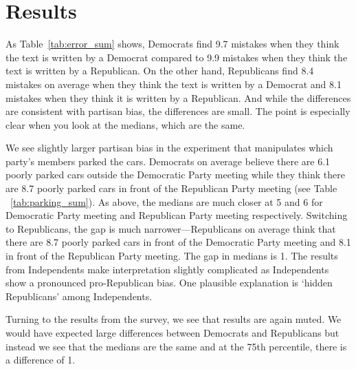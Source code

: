 \documentclass[12pt, letterpaper]{article}
\begin{document}
\section{Results}

As Table~\ref{tab:error_sum} shows, Democrats find 9.7 mistakes when they think the text is written by a Democrat compared to 9.9 mistakes when they think the text is written by a Republican. On the other hand, Republicans find 8.4 mistakes on average when they think the text is written by a Democrat and 8.1 mistakes when they think it is written by a Republican. And while the differences are consistent with partisan bias, the differences are small. The point is especially clear when you look at the medians, which are the same.



We see slightly larger partisan bias in the experiment that manipulates which party's members parked the cars. Democrats on average believe there are 6.1 poorly parked cars outside the Democratic Party meeting while they think there are 8.7 poorly parked cars in front of the Republican Party meeting (see Table ~\ref{tab:parking_sum}). As above, the medians are much closer at 5 and 6 for Democratic Party meeting and Republican Party meeting respectively. Switching to Republicans, the gap is much narrower---Republicans on average think that there are 8.7 poorly parked cars in front of the Democratic Party meeting and 8.1 in front of the Republican Party meeting. The gap in medians is 1. The results from Independents make interpretation slightly complicated as Independents show a pronounced pro-Republican bias. One plausible explanation is `hidden Republicans' among Independents.



Turning to the results from the survey, we see that results are again muted. We would have expected large differences between Democrats and Republicans but instead we see that the medians are the same and at the 75th percentile, there is a difference of 1.



\clearpage


\clearpage


\appendix
\renewcommand{\thesection}{SI \arabic{section}}
\setcounter{table}{0}\renewcommand\thetable{\thesection.\arabic{table}}  
\setcounter{figure}{0}\renewcommand\thefigure{\thesection.\arabic{figure}}
\end{document}
